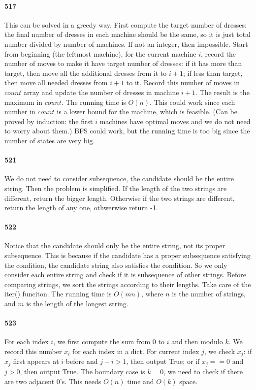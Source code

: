 \documentclass[11pt]{article}
\begin{document}
\begin{itemize}
\paragraph{517}
This can be solved in a greedy way. 
First compute the target number of dresses: the final number of dresses in each machine should be the same, so it is just total number divided by number of machines. If not an integer, then impossible.
Start from beginning (the leftmost machine), for the current machine $i$, record the number of moves to make it have target number of dresses: if it has more than target, then move all the additional dresses from it to $i+1$; if less than target, then move all needed dresses from $i+1$ to it. 
Record this number of moves in $count$ array and update the number of dresses in machine $i+1$.
The result is the maximum in $count$.
The running time is $O(n)$.
This could work since each number in $count$ is a lower bound for the machine, which is feasible. (Can be proved by induction: the first $i$ machines have optimal moves and we do not need to worry about them.)
BFS could work, but the running time is too big since the number of states are very big.

\paragraph{521}
We do not need to consider subsequence, the candidate should be the entire string. Then the problem is simplified. If the length of the two strings are different, return the bigger length. Otherwise if the two strings are different, return 
the length of any one, othwerwise return -1. 

\paragraph{522}
Notice that the candidate should only be the entire string, not its proper subsequence.
This is because if the candidate has a proper subsequence satisfying the condition, the candidate string also satisfies the 
condition. So we only consider each entire string and check if it is subsequence of other strings. 
Before comparing strings, we sort the strings according to their lengths. Take care of the iter() funciton. 
The running time is $O(mn)$, where $n$ is the number of strings, and $m$ is the length of the longest string.



\paragraph{523}
For each index $i$, we first compute the sum from 0 to $i$ and then modulo $k$. We record this number $x_i$ for each index in a dict.
For current index $j$, we check $x_j$: if $x_j$ first appears at $i$ before and $j - i > 1$, then output True; or if $x_j == 0$ and $j > 0$, then output True.
The boundary case is $k = 0$, we need to check if there are two adjacent 0's.
This needs $O(n)$ time and $O(k)$ space.
 

\end{itemize}
\end{document}
